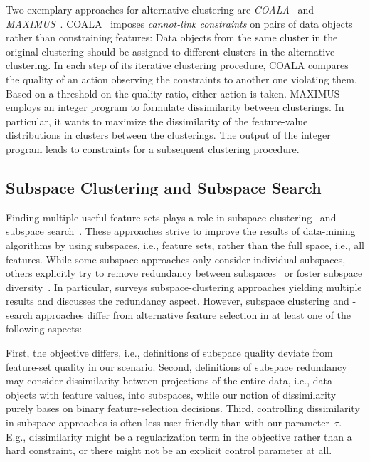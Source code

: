 \documentclass{article}
\theoremstyle{definition}
\begin{document}
Two exemplary approaches for alternative clustering are \emph{COALA}~\cite{bae2006coala} and \emph{MAXIMUS}~\cite{bae2010clustering}.
COALA~\cite{bae2006coala} imposes \emph{cannot-link constraints} on pairs of data objects rather than constraining features:
Data objects from the same cluster in the original clustering should be assigned to different clusters in the alternative clustering.
In each step of its iterative clustering procedure, COALA compares the quality of an action observing the constraints to another one violating them.
Based on a threshold on the quality ratio, either action is taken.
MAXIMUS~\cite{bae2010clustering} employs an integer program to formulate dissimilarity between clusterings.
In particular, it wants to maximize the dissimilarity of the feature-value distributions in clusters between the clusterings.
The output of the integer program leads to constraints for a subsequent clustering procedure.

\subsection{Subspace Clustering and Subspace Search}
\label{sec:afs:related-work:subspace}

Finding multiple useful feature sets plays a role in subspace clustering~\cite{hu2018subspace, mueller2009relevant} and subspace search~\cite{fouche2021efficient, nguyen20134s, trittenbach2019dimension}.
These approaches strive to improve the results of data-mining algorithms by using subspaces, i.e., feature sets, rather than the full space, i.e., all features.
While some subspace approaches only consider individual subspaces, others explicitly try to remove redundancy between subspaces~\cite{mueller2009relevant, nguyen20134s} or foster subspace diversity~\cite{fouche2021efficient, trittenbach2019dimension}.
In particular, \cite{hu2018subspace} surveys subspace-clustering approaches yielding multiple results and discusses the redundancy aspect.
However, subspace clustering and -search approaches differ from alternative feature selection in at least one of the following aspects:

First, the objective differs, i.e., definitions of subspace quality deviate from feature-set quality in our scenario.
Second, definitions of subspace redundancy may consider dissimilarity between projections of the entire data, i.e., data objects with feature values, into subspaces, while our notion of dissimilarity purely bases on binary feature-selection decisions.
Third, controlling dissimilarity in subspace approaches is often less user-friendly than with our parameter~$\tau$.
E.g., dissimilarity might be a regularization term in the objective rather than a hard constraint, or there might not be an explicit control parameter at all.
\end{document}
